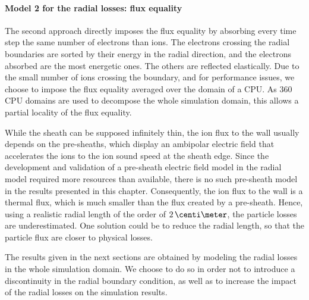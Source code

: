\paragraph{Model 2 for the  radial losses\string: flux equality\\}
The second approach directly imposes the flux equality by absorbing every time step the same number of electrons than ions.
The electrons crossing the radial boundaries are sorted by their energy in the radial direction, and the electrons absorbed are the most energetic ones.
The others are reflected elastically.
Due to the small number of ions crossing the boundary, and for performance issues, we choose to impose the flux equality averaged over the domain of a CPU.
As 360 CPU domains are used to decompose the whole simulation domain, this allows a partial locality of the flux equality. 

\vspace{1ex}
While the sheath can be supposed infinitely thin, the ion flux to the wall usually depends on the pre-sheaths, which display an ambipolar electric field that accelerates the ions to the ion sound speed at the sheath edge.
Since the development and validation of a pre-sheath electric field model in the radial model required more resources than available, there is no such pre-sheath model in the results presented in this chapter.
Consequently, the ion flux to the wall is a thermal flux, which is much smaller than the flux created by a pre-sheath.
Hence, using a realistic radial length  of the order of $2\,\centi\meter$, the particle losses are underestimated.
One solution could be to reduce the radial length, so that the particle flux are closer to physical losses.

The results given in the next sections are obtained by modeling the radial losses in the whole simulation domain.
We choose to do so in order not to introduce a discontinuity in the radial boundary condition, as well as to increase the impact of the radial losses on the simulation results.
